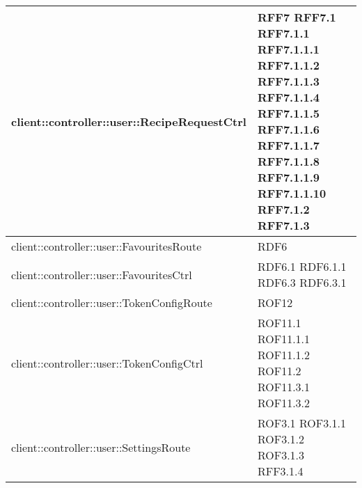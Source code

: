 \begin{center}
\begin{longtable}{| p{11cm} | p{2.5cm} |}
\hline
client::controller::user::RecipeRequestCtrl & RFF7 \newline RFF7.1 \newline RFF7.1.1 \newline RFF7.1.1.1 \newline RFF7.1.1.2 \newline RFF7.1.1.3 \newline RFF7.1.1.4 \newline RFF7.1.1.5 \newline RFF7.1.1.6 \newline RFF7.1.1.7 \newline RFF7.1.1.8 \newline RFF7.1.1.9 \newline RFF7.1.1.10 \newline RFF7.1.2 \newline RFF7.1.3 \\
\hline
client::controller::user::FavouritesRoute & RDF6 \\
\hline
client::controller::user::FavouritesCtrl & RDF6.1 \newline RDF6.1.1 \newline RDF6.3 \newline RDF6.3.1 \\
\hline
client::controller::user::TokenConfigRoute & ROF12 \\
\hline
client::controller::user::TokenConfigCtrl & ROF11.1 \newline ROF11.1.1 \newline ROF11.1.2 \newline ROF11.2 \newline ROF11.3.1 \newline ROF11.3.2 \\
\hline
client::controller::user::SettingsRoute & ROF3.1 \newline ROF3.1.1 \newline ROF3.1.2 \newline ROF3.1.3 \newline RFF3.1.4 \\
\hline

\end{longtable}
\end{center}
